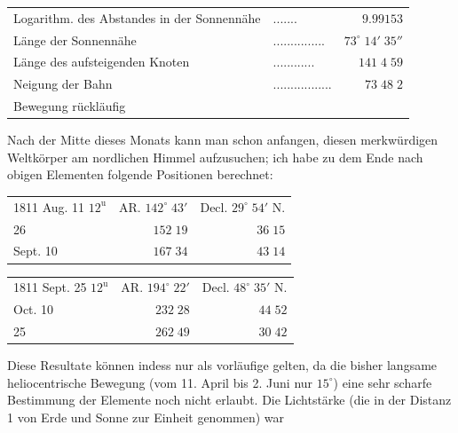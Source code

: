 \begin{center}\fontsize{10}{12}\selectfont\setlength{\tabcolsep}{4pt}\renewcommand{\arraystretch}{1.15}\begin{tabular}{llr}
Logarithm. des Abstandes in der Sonnennähe & .\;.\;.\;.\;.\;.\;. & $9.99153$\\
Länge der Sonnennähe & .\;.\;.\;.\;.\;.\;.\;.\;.\;.\;.\;.\;.\;.\;. & $73^\circ\;14'\;35''$\\
Länge des aufsteigenden Knoten & .\;.\;.\;.\;.\;.\;.\;.\;.\;.\;.\;. & $141\;4\;59$\\
Neigung der Bahn & .\;.\;.\;.\;.\;.\;.\;.\;.\;.\;.\;.\;.\;.\;.\;.\;. & $73\;48\;2$\\
Bewegung rückläufig &  & \\
\end{tabular}\end{center}

\par\indent Nach der Mitte dieses Monats kann man schon anfangen, diesen merkwürdigen Weltkörper am nordlichen Himmel aufzusuchen; ich habe zu dem Ende nach obigen Elementen folgende Positionen berechnet:

\begin{center}\fontsize{10}{12}\selectfont\setlength{\tabcolsep}{4pt}\renewcommand{\arraystretch}{1.15}\begin{tabular}{lrr}
1811 Aug. 11 $12^{\text{u}}$ & AR. $142^\circ\;43'$ & Decl. $29^\circ\;54'$ N.\\
26 & $152\;19$ & $36\;15$\\
Sept. 10 & $167\;34$ & $43\;14$\\
\end{tabular}\end{center}

\begin{center}\fontsize{10}{12}\selectfont\setlength{\tabcolsep}{4pt}\renewcommand{\arraystretch}{1.15}\begin{tabular}{lrr}
1811 Sept. 25 $12^{\text{u}}$ & AR. $194^\circ\;22'$ & Decl. $48^\circ\;35'$ N.\\
Oct. 10 & $232\;28$ & $44\;52$\\
25 & $262\;49$ & $30\;42$\\
\end{tabular}\end{center}

\par\indent Diese Resultate können indess nur als vorläufige gelten, da die bisher langsame heliocentrische Bewegung (vom 11. April bis 2. Juni nur $15^\circ$) eine sehr scharfe Bestimmung der Elemente noch nicht erlaubt. Die Lichtstärke (die in der Distanz 1 von Erde und Sonne zur Einheit genommen) war

